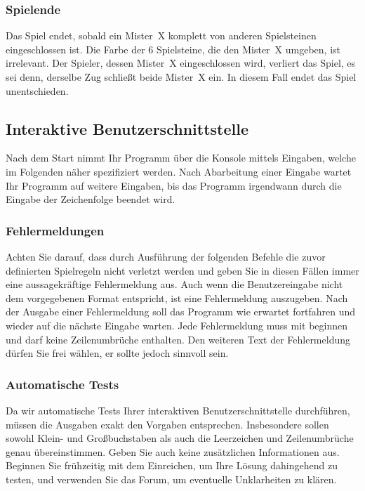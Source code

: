 \documentclass[ngerman, gray]{sdqassignment}
\begin{document}
\subsubsection{Spielende}
\label{ende}
Das Spiel endet, sobald ein Mister~X komplett von anderen Spielsteinen eingeschlossen ist. Die Farbe der 6 Spielsteine, die den Mister~X umgeben, ist irrelevant. Der Spieler, dessen Mister~X eingeschlossen wird, verliert das Spiel, es sei denn, derselbe Zug schließt beide Mister~X ein. In diesem Fall endet das Spiel unentschieden.

\subsection{Interaktive Benutzerschnittstelle}
Nach dem Start nimmt Ihr Programm über die Konsole mittels  Eingaben, welche im Folgenden näher spezifiziert werden. Nach Abarbeitung einer Eingabe wartet Ihr Programm auf weitere Eingaben, bis das Programm irgendwann durch die Eingabe der Zeichenfolge  beendet wird.

\subsubsection{Fehlermeldungen}
Achten Sie darauf, dass durch Ausführung der folgenden Befehle die zuvor definierten Spielregeln nicht verletzt werden und geben Sie in diesen Fällen immer eine aussagekräftige Fehlermeldung aus. Auch wenn die Benutzereingabe nicht dem vorgegebenen Format entspricht, ist eine Fehlermeldung auszugeben. Nach der Ausgabe einer Fehlermeldung soll das Programm wie erwartet fortfahren und wieder auf die nächste Eingabe warten. Jede Fehlermeldung muss mit  beginnen und darf keine Zeilenumbrüche enthalten. Den weiteren Text der Fehlermeldung dürfen Sie frei wählen, er sollte jedoch sinnvoll sein.

\subsubsection{Automatische Tests}
Da wir automatische Tests Ihrer interaktiven Benutzerschnittstelle durchführen, müssen die Ausgaben exakt den Vorgaben entsprechen. Insbesondere sollen sowohl Klein- und Großbuchstaben als auch die Leerzeichen und Zeilenumbrüche genau übereinstimmen. Geben Sie auch keine zusätzlichen Informationen aus. Beginnen Sie frühzeitig mit dem Einreichen, um Ihre Lösung dahingehend zu testen, und verwenden Sie das Forum, um eventuelle Unklarheiten zu klären.
\end{document}
